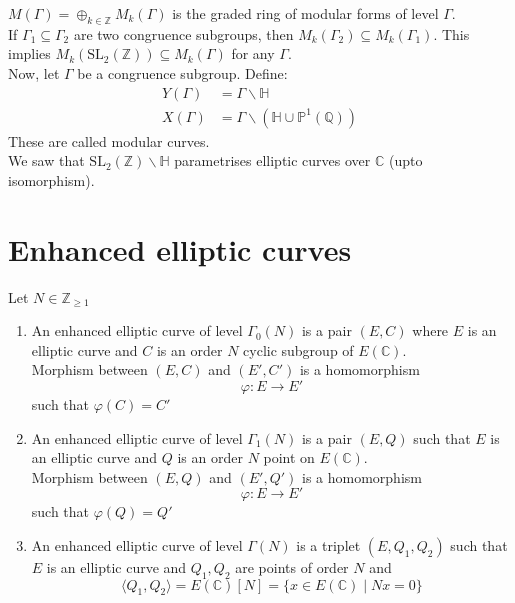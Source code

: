 \documentclass[oneside, 12pt, ]{scrbook}
\newcommand{\CC}{\mathbb C}
\newcommand{\QQ}{\mathbb Q}
\newcommand{\ZZ}{\mathbb Z}
\newcommand{\PP}{\mathbb{P}}
\newcommand{\SL}{\mathrm{SL}}
\newcommand{\HH}{\mathbb{H}}
\theoremstyle{theorem}
\begin{document}
$M(\Gamma) = \oplus_{k \in \ZZ} M_{k}(\Gamma)$ is the graded ring of modular forms of level $\Gamma$. \\

If $\Gamma_{1} \subseteq \Gamma_{2}$ are two congruence subgroups, then $M_{k}(\Gamma_{2}) \subseteq M_{k}(\Gamma_{1})$. This implies $M_{k}(\SL_{2}(\ZZ)) \subseteq M_{k}(\Gamma)$ for any $\Gamma$.\\

Now, let $\Gamma$ be a congruence subgroup. Define: 
\begin{align*}
Y(\Gamma) &= \Gamma \backslash \mathbb{H} \\
X(\Gamma) &= \Gamma \backslash (\mathbb{H} \cup \PP^1 (\QQ))
\end{align*}
These are called modular curves. \\

We saw that $\SL_{2}(\ZZ) \backslash \HH$ parametrises elliptic curves over $\CC$ (upto isomorphism).



\section{Enhanced elliptic curves}
Let $N \in \ZZ_{\geq 1}$
\begin{definition}
\begin{enumerate}
\item An enhanced elliptic curve of level $\Gamma_{0}(N)$ is a pair $(E,C)$ where $E$ is an elliptic curve and $C$ is an order $N$ cyclic subgroup of $E(\CC)$. \\
Morphism between $(E,C)$ and $(E',C')$ is a homomorphism $$\varphi : E \rightarrow E'$$ such that $\varphi (C) = C'$
\item An enhanced elliptic curve of level $\Gamma_{1}(N)$ is a pair $(E,Q)$ such that  $E$ is an elliptic curve and $Q$ is an order $N$ point on $E(\CC)$. \\
Morphism between $(E,Q)$ and $(E',Q')$ is a homomorphism $$\varphi : E \rightarrow E'$$ such that $\varphi (Q) = Q'$
\item An enhanced elliptic curve of level $\Gamma(N)$ is a triplet $(E,Q_{1},Q_{2})$ such that $E$ is an elliptic curve and $Q_{1},Q_{2}$ are points of order $N$ and $$\langle Q_{1} , Q_{2} \rangle = E(\CC)[N] = \{ x \in E(\CC) \mid Nx =0\}$$
\end{enumerate}
\end{definition}
\end{document}
